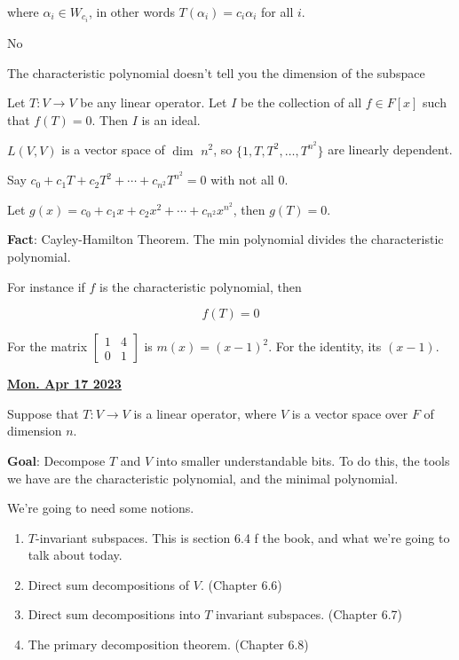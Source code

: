 \documentclass[12pt]{article}
\renewcommand{\date}[1]{\underline{\bf #1}}
\begin{document}
  where $\alpha_i \in W_{c_i}$, in other words $T(\alpha_i) = c_i \alpha_i$ for
  all $i$.

  {
    No
  }

  The characteristic polynomial doesn't tell you the dimension of the subspace

  Let $T: V \to V$ be any linear operator. Let $I$ be the collection of all $f
  \in F[x]$ such that $f(T) = 0$. Then $I$ is an ideal.

  $L(V, V)$ is a vector space of $\dim$ $n^2$, so $\{1, T, T^2, \dots,
  T^{n^2}\}$ are linearly dependent.

  Say $c_0 + c_1 T + c_2 T^2 + \cdots + c_{n^2} T^{n^2} = 0$ with not all $0$.

  Let $g(x) = c_0 + c_1 x + c_2 x^2 + \cdots + c_{n^2} x^{n^2}$, then $g(T) =
  0$.


  {\bf Fact}: Cayley-Hamilton Theorem. The min polynomial divides the
  characteristic polynomial.

  For instance if $f$ is the characteristic polynomial, then

  \[
    f(T) = 0
  \]

  For the matrix $\begin{bmatrix} 1 & 4 \\ 0 & 1 \end{bmatrix}$ is $m(x) = (x -
  1)^2$. For the identity, its $(x - 1)$.

  \date{Mon. Apr 17 2023}

  Suppose that $T: V \to V$ is a linear operator, where $V$ is a vector space
  over $F$ of dimension $n$.

  {\bf Goal}: Decompose $T$ and $V$ into smaller understandable bits. To do
  this, the tools we have are the characteristic polynomial, and the minimal
  polynomial.

  We're going to need some notions.

  \begin{enumerate}
    \item $T$-invariant subspaces. This is section 6.4 f the book, and what
      we're going to talk about today.
    \item Direct sum decompositions of $V$. (Chapter 6.6)
    \item Direct sum decompositions into $T$ invariant subspaces. (Chapter 6.7)
    \item The primary decomposition theorem. (Chapter 6.8)
  \end{enumerate}
\end{document}
